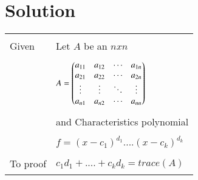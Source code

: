 \documentclass[journal,12pt]{IEEEtran}
\begin{document}
\section{\textbf{Solution}}
\begin{longtable}{|l|l|}
\hline
\multirow{3}{*}{Given} & \\
& Let $A$ be an $nxn$ \\
&\\
& $A = \begin{pmatrix}a_{11}&a_{12}&\cdots &a_{1n} \\
a_{21}&a_{22}&\cdots &a_{2n} \\
\vdots & \vdots & \ddots & \vdots\\
a_{n1}&a_{n2}&\cdots &a_{nn}\end{pmatrix}$\\
&\\
& and Characteristics polynomial\\
&\\
&  $f= (x-c_1)^{d_1}....(x-c_k)^{d_k}$\\
&\\
\hline
\multirow{3}{*}{To proof} & \\
& $c_1d_1+....+c_kd_k = trace(A)$\\
&\\
\hline
\end{longtable}
\newpage
\renewcommand{\thetable}{1}
\end{document}
